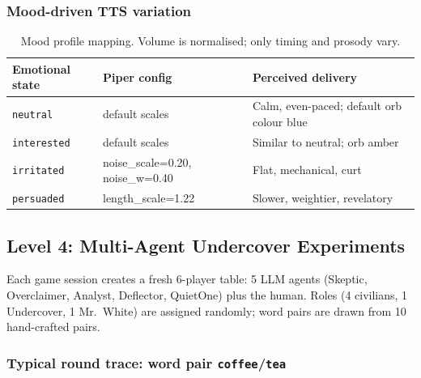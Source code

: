 \documentclass[11pt,a4paper]{article}
\begin{document}
\subsubsection{Mood-driven TTS variation}

\begin{table}[H]
\centering
\small
\renewcommand{\arraystretch}{1.2}
\begin{tabularx}{\linewidth}{l l X}
\toprule
\textbf{Emotional state} & \textbf{Piper config} & \textbf{Perceived delivery} \\
\midrule
\texttt{neutral} & default scales & Calm, even-paced; default orb colour blue \\
\texttt{interested} & default scales & Similar to neutral; orb amber \\
\texttt{irritated} & noise\_scale=0.20, noise\_w=0.40 & Flat, mechanical, curt \\
\texttt{persuaded} & length\_scale=1.22 & Slower, weightier, revelatory \\
\bottomrule
\end{tabularx}
\caption{Mood profile mapping. Volume is normalised; only timing and prosody vary.}
\end{table}

\subsection{Level 4: Multi-Agent Undercover Experiments}

Each game session creates a fresh 6-player table: 5 LLM agents (Skeptic, Overclaimer,
Analyst, Deflector, QuietOne) plus the human. Roles (4 civilians, 1 Undercover, 1
Mr.\ White) are assigned randomly; word pairs are drawn from 10 hand-crafted pairs.

\subsubsection{Typical round trace: word pair \texttt{coffee}/\texttt{tea}}
\end{document}
